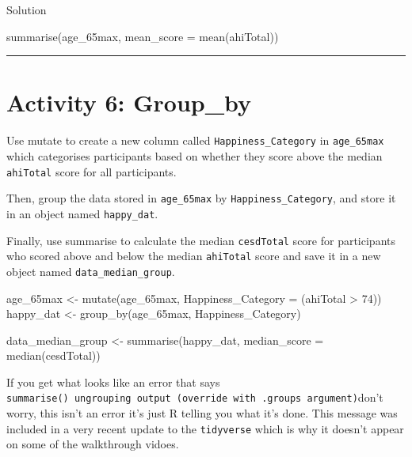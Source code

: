 \documentclass[
  oneside]{book}
\newenvironment{Shaded}{\begin{snugshade}}{\end{snugshade}}
\newcommand{\AttributeTok}[1]{\textcolor[rgb]{0.77,0.63,0.00}{#1}}
\newcommand{\DecValTok}[1]{\textcolor[rgb]{0.00,0.00,0.81}{#1}}
\newcommand{\FunctionTok}[1]{\textcolor[rgb]{0.00,0.00,0.00}{#1}}
\newcommand{\NormalTok}[1]{#1}
\newcommand{\OtherTok}[1]{\textcolor[rgb]{0.56,0.35,0.01}{#1}}
\newcommand{\SpecialCharTok}[1]{\textcolor[rgb]{0.00,0.00,0.00}{#1}}
\begin{document}
Solution

\begin{Shaded}
\begin{Highlighting}[]
\FunctionTok{summarise}\NormalTok{(age\_65max, }\AttributeTok{mean\_score =} \FunctionTok{mean}\NormalTok{(ahiTotal))}
\end{Highlighting}
\end{Shaded}

\begin{center}\rule{0.5\linewidth}{0.5pt}\end{center}

\hypertarget{activity-6-group_by}{%
\section{Activity 6: Group\_by}\label{activity-6-group_by}}

Use mutate to create a new column called \texttt{Happiness\_Category} in \texttt{age\_65max} which categorises participants based on whether they score above the median \texttt{ahiTotal} score for all participants.

Then, group the data stored in \texttt{age\_65max} by \texttt{Happiness\_Category}, and store it in an object named \texttt{happy\_dat}.

Finally, use summarise to calculate the median \texttt{cesdTotal} score for participants who scored above and below the median \texttt{ahiTotal} score and save it in a new object named \texttt{data\_median\_group}.

\begin{Shaded}
\begin{Highlighting}[]
\NormalTok{age\_65max }\OtherTok{\textless{}{-}} \FunctionTok{mutate}\NormalTok{(age\_65max, }\AttributeTok{Happiness\_Category =}\NormalTok{ (ahiTotal }\SpecialCharTok{\textgreater{}} \DecValTok{74}\NormalTok{))}
\NormalTok{happy\_dat }\OtherTok{\textless{}{-}} \FunctionTok{group\_by}\NormalTok{(age\_65max, Happiness\_Category)}

\NormalTok{data\_median\_group }\OtherTok{\textless{}{-}} \FunctionTok{summarise}\NormalTok{(happy\_dat, }\AttributeTok{median\_score =} \FunctionTok{median}\NormalTok{(cesdTotal))}
\end{Highlighting}
\end{Shaded}

\begin{info}
If you get what looks like an error that says
\texttt{summarise()\ ungrouping\ output\ (override\ with\ .groups\ argument)}don't
worry, this isn't an error it's just R telling you what it's done. This
message was included in a very recent update to the \texttt{tidyverse}
which is why it doesn't appear on some of the walkthrough vidoes.
\end{info}
\end{document}
